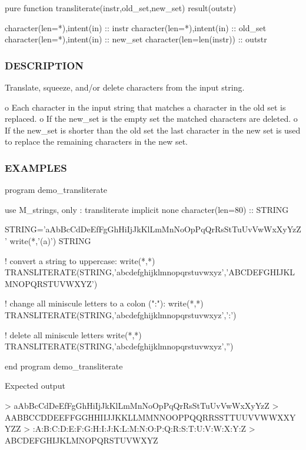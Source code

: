 \begin{DoxyVerb}pure function transliterate(instr,old_set,new_set) result(outstr)

 character(len=*),intent(in)  :: instr
 character(len=*),intent(in)  :: old_set
 character(len=*),intent(in)  :: new_set
 character(len=len(instr))    :: outstr
\end{DoxyVerb}


\subsubsection*{D\+E\+S\+C\+R\+I\+P\+T\+I\+ON}

Translate, squeeze, and/or delete characters from the input string.

o Each character in the input string that matches a character in the old set is replaced. o If the new\+\_\+set is the empty set the matched characters are deleted. o If the new\+\_\+set is shorter than the old set the last character in the new set is used to replace the remaining characters in the new set.

\subsubsection*{E\+X\+A\+M\+P\+L\+ES}

\begin{DoxyVerb}program demo_transliterate

 use M_strings, only : transliterate
 implicit none
 character(len=80)   :: STRING

 STRING='aAbBcCdDeEfFgGhHiIjJkKlLmMnNoOpPqQrRsStTuUvVwWxXyYzZ'
 write(*,'(a)') STRING

 ! convert a string to uppercase:
 write(*,*) TRANSLITERATE(STRING,'abcdefghijklmnopqrstuvwxyz','ABCDEFGHIJKLMNOPQRSTUVWXYZ')

 ! change all miniscule letters to a colon (":"):
 write(*,*) TRANSLITERATE(STRING,'abcdefghijklmnopqrstuvwxyz',':')

 ! delete all miniscule letters
 write(*,*) TRANSLITERATE(STRING,'abcdefghijklmnopqrstuvwxyz','')

end program demo_transliterate

Expected output

 > aAbBcCdDeEfFgGhHiIjJkKlLmMnNoOpPqQrRsStTuUvVwWxXyYzZ
 > AABBCCDDEEFFGGHHIIJJKKLLMMNNOOPPQQRRSSTTUUVVWWXXYYZZ
 > :A:B:C:D:E:F:G:H:I:J:K:L:M:N:O:P:Q:R:S:T:U:V:W:X:Y:Z
 > ABCDEFGHIJKLMNOPQRSTUVWXYZ \end{DoxyVerb}
 \mbox{\label{namespacem__strings_a956638e87e83520f170ccefefac6722b}} 
